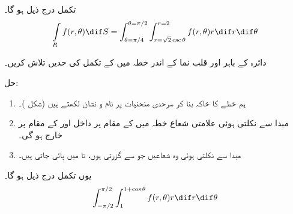  تکمل درج ذیل ہو گا۔
\begin{align*}
\int\limits_R f(r,\theta)\dif S=\int_{\theta=\pi/4}^{\theta=\pi/2}\int_{r=\sqrt{2}\csc\theta}^{r=2}f(r,\theta)r\dif r\dif \theta
\end{align*}

دائرہ  کے باہر اور قلب نما  کے اندر خطہ میں   کے تکمل کی  حدیں  تلاش کریں۔ 

حل:\quad
\begin{enumerate}[1.]
\item
{}\quad
ہم خطے کا خاکہ بنا کر  سرحدی منحنیات پر نام و نشان لکھتے ہیں (شکل )۔
\item
{}\quad
مبدا سے  نکلتی ہوئی  علامتی شعاع خطہ  میں  کے مقام پر داخل اور  کے مقام پر خارج ہو گی۔
\item
{}\quad
مبدا سے نکلتی ہوئی وہ شعاعیں جو  سے گزرتی ہوں،  تا  میں پائی جاتی ہیں۔
\end{enumerate}
یوں تکمل درج ذیل ہو گا۔
\begin{align*}
\int_{-\pi/2}^{\pi/2}\int_{1}^{1+\cos\theta}f(r,\theta)r\dif r\dif \theta
\end{align*}

